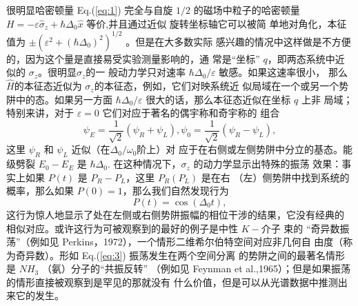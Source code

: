 很明显哈密顿量 Eq.(\ref{eq:1}) 完全与自旋 $1/2$ 的磁场中粒子的哈密顿量
$H=-\varepsilon\hat{\sigma}_{z}+\hbar\Delta_{0}\hat{x}$ 等价,并且通过近似
旋转坐标轴它可以被简 单地对角化，本征值为
$\pm(\varepsilon^{2}+(\hbar\Delta_{0})^{2})^{1/2}$ 。但是在大多数实际
感兴趣的情况中这样做是不方便的，因为这个量是直接易受实验测量影响的，通
常是“坐标” $q$，即两态系统中近似的 $\sigma_{z}$。很明显$\sigma_{z}$的一
般动力学只对速率 $\hbar\Delta_{0}/\varepsilon$ 敏感。如果这速率很小，
那么$\hat{H}$的本征态近似为 $\sigma_{z}$的本征态，例如，它们对映系统近
似局域在一个或另一个势阱中的态。如果另一方面
$\hbar\Delta_{0}/\varepsilon$ 很大的话，那么本征态近似在坐标 $q$ 上非
局域；特别来讲，对于 $\varepsilon=0$ 它们对应于著名的偶宇称和奇宇称的
组合
\begin{equation}
  \label{eq:2}
  \psi_{E}= \frac{1}{\sqrt{2}}(\psi_{R}+\psi_{L}),\psi_{0}=\frac{1}{\sqrt{2}}(\psi_{R}-\psi_{L}),
\end{equation}
这里 $\psi_{R}$ 和 $\psi_{L}$ 近似（在$\Delta_{0}/\omega_{0}$阶上）对
应于在右侧或左侧势阱中分立的基态。能级劈裂 $E_{0}-E_{E}$ 是
$\hbar\Delta_{0}$. 在这种情况下，$\sigma_{z}$ 的动力学显示出特殊的振荡
效果：事实上如果 $P(t)$ 是 $P_{R}-P_{L}$，这里 $P_{R}(P_{L})$ 是在右
（左）侧势阱中找到系统的概率，那么如果 $P(0)=1$，那么我们自然发现行为
\begin{equation}
  \label{eq:3}
  P(t)=\cos(\Delta_{0}t),
\end{equation}
这行为惊人地显示了处在左侧或右侧势阱振幅的相位干涉的结果，它没有经典的
相似对应。或许这行为可被观察到的最好的例子是中性 $K-\text{介子}$ 束的
“奇异数振荡”（例如见 Perkins，1972），一个情形二维希尔伯特空间对应非几何自
由度（称为奇异数）。形如 Eq.(\ref{eq:3}) 振荡发生在两个空间分离
的势阱之间的最著名情形是 $NH_{3}$ （氨）分子的“共振反转” （例如见
Feynman et al.,1965）；但是如果振荡的情形直接被观察到是罕见的那就没有
什么价值，但是可以从光谱数据中推测出来它的发生。
